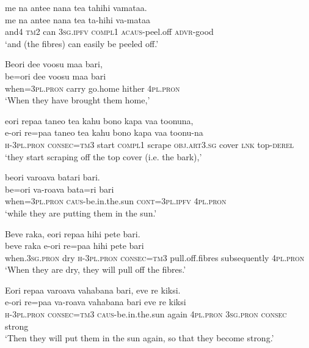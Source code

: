 \ea\label{ex:text4-13}
me na antee nana tea tahihi vamataa.\\
\gll me	na	antee	nana	tea	ta-hihi	va-mataa\\
     and4	\textsc{tm}2	can	3\textsc{sg}.\textsc{ipfv}	\textsc{compl}1	\textsc{acaus}-peel.off	\textsc{advr}-good\\
\glt `and (the fibres) can easily be peeled off.'
\z

\ea\label{ex:text4-14}
Beori dee voosu maa bari,\\
\gll be=ori	dee	voosu	maa	bari\\
     when=3\textsc{pl}.\textsc{pron}	carry	go.home	hither	4\textsc{pl}.\textsc{pron}\\
\glt `When they have brought them home,'
\z

\ea\label{ex:text4-15}
eori repaa taneo tea kahu bono kapa vaa toonuna,\\
\gll e-ori	re=paa	taneo	tea	kahu	bono	kapa	vaa	toonu-na\\
     \textsc{h}-3\textsc{pl}.\textsc{pron}	\textsc{consec}=\textsc{tm}3	start	\textsc{compl}1	scrape	\textsc{obj}.\textsc{art}3.\textsc{sg}	cover	\textsc{lnk}	top-\textsc{derel}\\
\glt `they start scraping off the top cover (i.e. the bark),'
\z

\ea\label{ex:text4-16}
beori varoava batari bari.\\
\gll be=ori	va-roava	bata=ri	bari\\
     when=3\textsc{pl}.\textsc{pron}	\textsc{caus}-be.in.the.sun	\textsc{cont}=3\textsc{pl}.\textsc{ipfv}	4\textsc{pl}.\textsc{pron}\\
\glt `while they are putting them in the sun.'
\z

\ea\label{ex:text4-17}
Beve raka, eori repaa hihi pete bari.\\
\gll beve	raka	e-ori	re=paa	hihi	pete	bari\\
     when.3\textsc{sg}.\textsc{pron}	dry	\textsc{h}-3\textsc{pl}.\textsc{pron}	\textsc{consec}=\textsc{tm}3	pull.off.fibres	subsequently	4\textsc{pl}.\textsc{pron}\\
\glt `When they are dry, they will pull off the fibres.'
\z

\ea\label{ex:text4-18}
Eori repaa varoava vahabana bari, eve re kiksi.\\
\gll e-ori	re=paa	va-roava	vahabana	bari	eve	re	kiksi\\
     \textsc{h}-3\textsc{pl}.\textsc{pron}	\textsc{consec}=\textsc{tm}3	\textsc{caus}-be.in.the.sun	again	4\textsc{pl}.\textsc{pron}	3\textsc{sg}.\textsc{pron}	\textsc{consec}	strong\\
\glt `Then they will put them in the sun again, so that they become strong.'
\z

